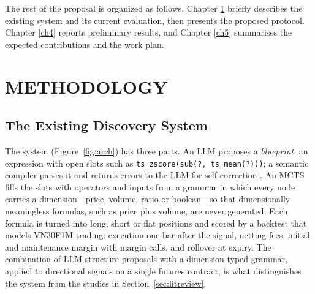 \documentclass[12pt,a4paper,oneside]{book}
\theoremstyle{definition}
\newcommand{\code}[1]{\texttt{#1}}
\begin{document}
The rest of the proposal is organized as follows. Chapter \ref{ch3} briefly describes the existing system and its current evaluation, then presents the proposed protocol. Chapter \ref{ch4} reports preliminary results, and Chapter \ref{ch5} summarises the expected contributions and the work plan.

\chapter{METHODOLOGY}
\label{ch3}

\section{The Existing Discovery System}

The system (Figure~\ref{fig:arch}) has three parts. An LLM proposes a \emph{blueprint}, an expression with open slots such as \code{ts\_zscore(sub(?, ts\_mean(?)))}; a semantic compiler parses it and returns errors to the LLM for self-correction \cite{madaan2023}. An MCTS fills the slots with operators and inputs from a grammar in which every node carries a dimension---price, volume, ratio or boolean---so that dimensionally meaningless formulas, such as price plus volume, are never generated. Each formula is turned into long, short or flat positions and scored by a backtest that models VN30F1M trading: execution one bar after the signal, netting fees, initial and maintenance margin with margin calls, and rollover at expiry. The combination of LLM structure proposals with a dimension-typed grammar, applied to directional signals on a single futures contract, is what distinguishes the system from the studies in Section~\ref{sec:litreview}.
\end{document}
